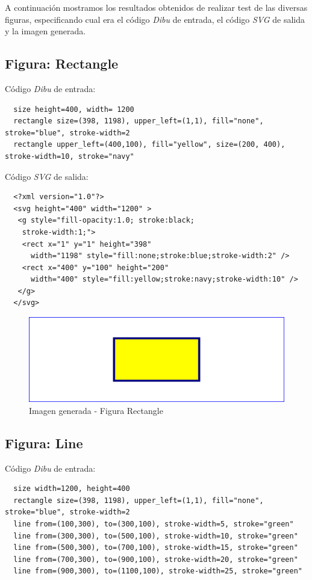A continuación mostramos los resultados obtenidos de realizar test de las diversas figuras, especificando cual era el código \textit{Dibu} de entrada, el código \textit{SVG} de salida y la imagen generada.

\subsection{\textbf{Figura:} Rectangle}

Código \textit{Dibu} de entrada:

\begin{lstlisting}
  size height=400, width= 1200
  rectangle size=(398, 1198), upper_left=(1,1), fill="none", stroke="blue", stroke-width=2
  rectangle upper_left=(400,100), fill="yellow", size=(200, 400), stroke-width=10, stroke="navy"
\end{lstlisting}

Código \textit{SVG} de salida:

\begin{lstlisting}
  <?xml version="1.0"?>
  <svg height="400" width="1200" >
   <g style="fill-opacity:1.0; stroke:black;
    stroke-width:1;">
    <rect x="1" y="1" height="398"
      width="1198" style="fill:none;stroke:blue;stroke-width:2" />
    <rect x="400" y="100" height="200"
      width="400" style="fill:yellow;stroke:navy;stroke-width:10" />
   </g>
  </svg>
\end{lstlisting}

\begin{figure}[H]
\centering
\includegraphics[width=150mm]{imagenes/rectangle.jpg}
\caption{Imagen generada - Figura Rectangle}
\end{figure}

\subsection{\textbf{Figura:} Line}

Código \textit{Dibu} de entrada:

\begin{lstlisting}
  size width=1200, height=400
  rectangle size=(398, 1198), upper_left=(1,1), fill="none", stroke="blue", stroke-width=2
  line from=(100,300), to=(300,100), stroke-width=5, stroke="green"
  line from=(300,300), to=(500,100), stroke-width=10, stroke="green"
  line from=(500,300), to=(700,100), stroke-width=15, stroke="green"
  line from=(700,300), to=(900,100), stroke-width=20, stroke="green"
  line from=(900,300), to=(1100,100), stroke-width=25, stroke="green"
\end{lstlisting}

